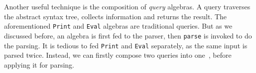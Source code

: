 Another useful technique is the composition of \textit{query} algebras. A query traverses the abstract syntax tree, collects information and returns the result. The aforementioned \lstinline{Print} and \lstinline{Eval} algebras are traditional queries. But as we discussed before, an algebra is first fed to the parser, then \lstinline{parse} is invoked to do the parsing. It is tedious to fed \lstinline{Print} and \lstinline{Eval} separately, as the same input is parsed twice. Instead, we can firstly compose two queries into one~\cite{Oliveira:2012,oliveira2013feature}, before applying it for parsing.

